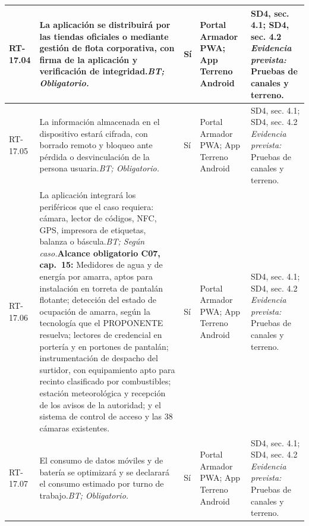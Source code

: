 \begin{paginaHorizontalSynaptix}
\begin{longtable}{|L{0.09\AnchoMatrizTDoce}|L{0.385\AnchoMatrizTDoce}|L{0.065\AnchoMatrizTDoce}|L{0.18\AnchoMatrizTDoce}|L{0.28\AnchoMatrizTDoce}|}
RT-\allowbreak{}17.\allowbreak{}04 &
La aplicación se distribuirá por las tiendas oficiales o mediante gestión de flota corporativa, con firma de la aplicación y verificación de integridad.\newline\textit{BT; Obligatorio.} &
Sí &
Portal Armador PWA; App Terreno Android &
SD4, sec. 4.1; SD4, sec. 4.2 \newline\textit{Evidencia prevista:} Pruebas de canales y terreno. \\ \hline

RT-\allowbreak{}17.\allowbreak{}05 &
La información almacenada en el dispositivo estará cifrada, con borrado remoto y bloqueo ante pérdida o desvinculación de la persona usuaria.\newline\textit{BT; Obligatorio.} &
Sí &
Portal Armador PWA; App Terreno Android &
SD4, sec. 4.1; SD4, sec. 4.2 \newline\textit{Evidencia prevista:} Pruebas de canales y terreno. \\ \hline

RT-\allowbreak{}17.\allowbreak{}06 &
La aplicación integrará los periféricos que el caso requiera: cámara, lector de códigos, NFC, GPS, impresora de etiquetas, balanza o báscula.\newline\textit{BT; Según caso.}\newline\textbf{Alcance obligatorio C07, cap.~15:} Medidores de agua y de energía por amarra, aptos para instalación en torreta de pantalán flotante; detección del estado de ocupación de amarra, según la tecnología que el PROPONENTE resuelva; lectores de credencial en portería y en portones de pantalán; instrumentación de despacho del surtidor, con equipamiento apto para recinto clasificado por combustibles; estación meteorológica y recepción de los avisos de la autoridad; y el sistema de control de acceso y las 38 cámaras existentes. &
Sí &
Portal Armador PWA; App Terreno Android &
SD4, sec. 4.1; SD4, sec. 4.2 \newline\textit{Evidencia prevista:} Pruebas de canales y terreno. \\ \hline

RT-\allowbreak{}17.\allowbreak{}07 &
El consumo de datos móviles y de batería se optimizará y se declarará el consumo estimado por turno de trabajo.\newline\textit{BT; Obligatorio.} &
Sí &
Portal Armador PWA; App Terreno Android &
SD4, sec. 4.1; SD4, sec. 4.2 \newline\textit{Evidencia prevista:} Pruebas de canales y terreno. \\ \hline


\end{longtable}
\end{paginaHorizontalSynaptix}
